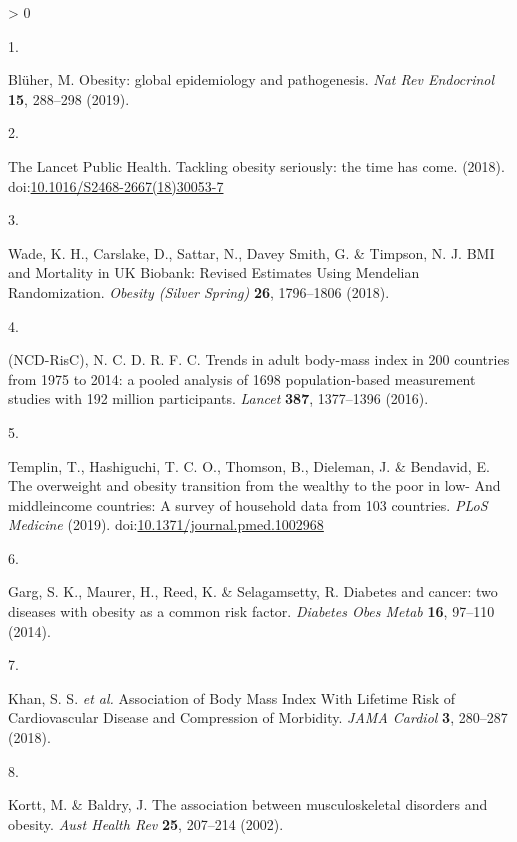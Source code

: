 \documentclass[11pt,twoside]{bristolthesis}
\newlength{\cslhangindent}
\newlength{\csllabelwidth}
\newenvironment{CSLReferences}[2] %
 {%
  \setlength{\parindent}{0pt}
  \ifodd #1 \everypar{\setlength{\hangindent}{\cslhangindent}}\ignorespaces\fi
  \ifnum #2 > 0
  \setlength{\parskip}{#2\baselineskip}
  \fi
 }%
 {}
\newcommand{\CSLLeftMargin}[1]{\parbox[t]{\csllabelwidth}{#1}}
\newcommand{\CSLRightInline}[1]{\parbox[t]{\linewidth - \csllabelwidth}{#1}\break}
\begin{document}
\hypertarget{refs}{}
\begin{CSLReferences}{0}{0}
\leavevmode\hypertarget{ref-Bluher2019}{}%
\CSLLeftMargin{1. }
\CSLRightInline{Blüher, M. {Obesity: global epidemiology and pathogenesis}. \emph{Nat Rev Endocrinol} \textbf{15}, 288--298 (2019).}

\leavevmode\hypertarget{ref-TheLancetPublicHealth2018}{}%
\CSLLeftMargin{2. }
\CSLRightInline{The Lancet Public Health. {Tackling obesity seriously: the time has come}. (2018). doi:\href{https://doi.org/10.1016/S2468-2667(18)30053-7}{10.1016/S2468-2667(18)30053-7}}

\leavevmode\hypertarget{ref-Wade2018}{}%
\CSLLeftMargin{3. }
\CSLRightInline{Wade, K. H., Carslake, D., Sattar, N., Davey Smith, G. \& Timpson, N. J. {BMI and Mortality in UK Biobank: Revised Estimates Using Mendelian Randomization}. \emph{Obesity (Silver Spring)} \textbf{26}, 1796--1806 (2018).}

\leavevmode\hypertarget{ref-NCD-RisC2016}{}%
\CSLLeftMargin{4. }
\CSLRightInline{(NCD-RisC), N. C. D. R. F. C. {Trends in adult body-mass index in 200 countries from 1975 to 2014: a pooled analysis of 1698 population-based measurement studies with 19{{}}2 million participants}. \emph{Lancet} \textbf{387}, 1377--1396 (2016).}

\leavevmode\hypertarget{ref-Templin2019}{}%
\CSLLeftMargin{5. }
\CSLRightInline{Templin, T., Hashiguchi, T. C. O., Thomson, B., Dieleman, J. \& Bendavid, E. {The overweight and obesity transition from the wealthy to the poor in low- And middleincome countries: A survey of household data from 103 countries}. \emph{PLoS Medicine} (2019). doi:\href{https://doi.org/10.1371/journal.pmed.1002968}{10.1371/journal.pmed.1002968}}

\leavevmode\hypertarget{ref-Garg2014}{}%
\CSLLeftMargin{6. }
\CSLRightInline{Garg, S. K., Maurer, H., Reed, K. \& Selagamsetty, R. {Diabetes and cancer: two diseases with obesity as a common risk factor}. \emph{Diabetes Obes Metab} \textbf{16}, 97--110 (2014).}

\leavevmode\hypertarget{ref-Khan2018}{}%
\CSLLeftMargin{7. }
\CSLRightInline{Khan, S. S. \emph{et al.} {Association of Body Mass Index With Lifetime Risk of Cardiovascular Disease and Compression of Morbidity}. \emph{JAMA Cardiol} \textbf{3}, 280--287 (2018).}

\leavevmode\hypertarget{ref-Kortt2002}{}%
\CSLLeftMargin{8. }
\CSLRightInline{Kortt, M. \& Baldry, J. {The association between musculoskeletal disorders and obesity}. \emph{Aust Health Rev} \textbf{25}, 207--214 (2002).}


\end{CSLReferences}
\end{document}
